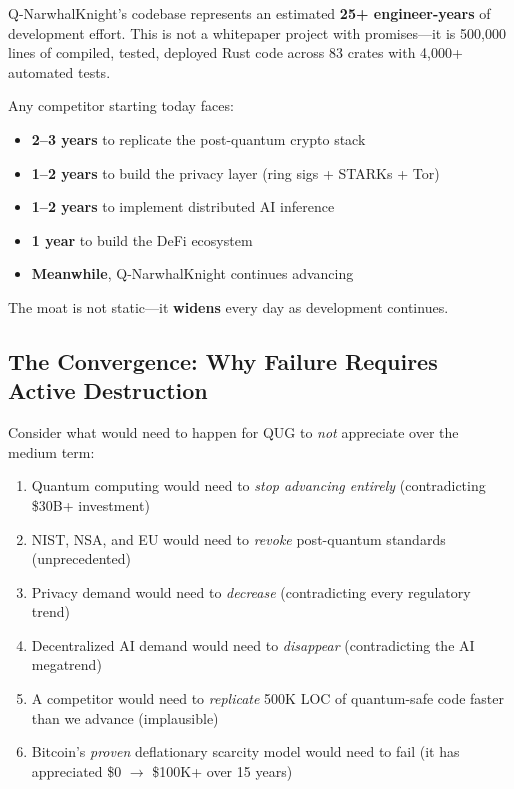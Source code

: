 \documentclass[11pt,a4paper]{article}
\begin{document}
\begin{keyinsight}
Q-NarwhalKnight's codebase represents an estimated \textbf{25+ engineer-years} of development effort. This is not a whitepaper project with promises---it is 500,000 lines of compiled, tested, deployed Rust code across 83 crates with 4,000+ automated tests.

Any competitor starting today faces:
\begin{itemize}[leftmargin=1.5em]
    \item \textbf{2--3 years} to replicate the post-quantum crypto stack
    \item \textbf{1--2 years} to build the privacy layer (ring sigs + STARKs + Tor)
    \item \textbf{1--2 years} to implement distributed AI inference
    \item \textbf{1 year} to build the DeFi ecosystem
    \item \textbf{Meanwhile}, Q-NarwhalKnight continues advancing
\end{itemize}

The moat is not static---it \textbf{widens} every day as development continues.
\end{keyinsight}

\subsection{The Convergence: Why Failure Requires Active Destruction}

Consider what would need to happen for QUG to \textit{not} appreciate over the medium term:

\begin{enumerate}[leftmargin=1.5em]
    \item Quantum computing would need to \textit{stop advancing entirely} (contradicting \$30B+ investment)
    \item NIST, NSA, and EU would need to \textit{revoke} post-quantum standards (unprecedented)
    \item Privacy demand would need to \textit{decrease} (contradicting every regulatory trend)
    \item Decentralized AI demand would need to \textit{disappear} (contradicting the AI megatrend)
    \item A competitor would need to \textit{replicate} 500K LOC of quantum-safe code faster than we advance (implausible)
    \item Bitcoin's \textit{proven} deflationary scarcity model would need to fail (it has appreciated \$0 $\to$ \$100K+ over 15 years)
\end{enumerate}
\end{document}
